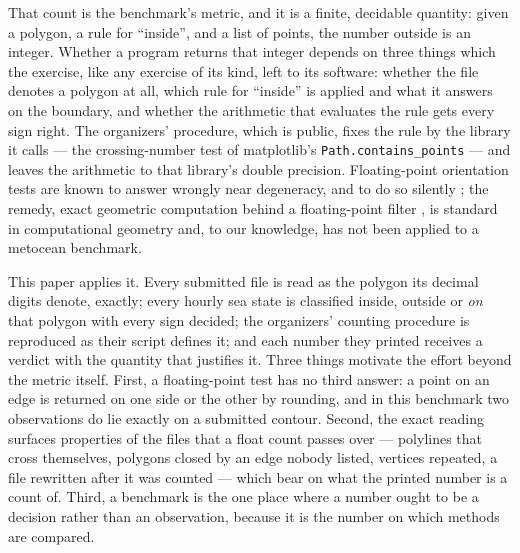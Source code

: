 \documentclass[preprint,11pt,authoryear]{elsarticle}
\begin{document}
That count is the benchmark's metric, and it is a finite, decidable quantity: given a polygon, a rule for ``inside'', and a list of points, the number outside is an integer. Whether a program returns that integer depends on three things which the exercise, like any exercise of its kind, left to its software: whether the file denotes a polygon at all, which rule for ``inside'' is applied and what it answers on the boundary, and whether the arithmetic that evaluates the rule gets every sign right. The organizers' procedure, which is public, fixes the rule by the library it calls --- the crossing-number test of matplotlib's \texttt{Path.contains\_points} \citep{hunter2007} --- and leaves the arithmetic to that library's double precision. Floating-point orientation tests are known to answer wrongly near degeneracy, and to do so silently \citep{kettner2008,shewchuk1997}; the remedy, exact geometric computation behind a floating-point filter \citep{yap1997,fortune1996}, is standard in computational geometry and, to our knowledge, has not been applied to a metocean benchmark.

This paper applies it. Every submitted file is read as the polygon its decimal digits denote, exactly; every hourly sea state is classified inside, outside or \emph{on} that polygon with every sign decided; the organizers' counting procedure is reproduced as their script defines it; and each number they printed receives a verdict with the quantity that justifies it. Three things motivate the effort beyond the metric itself. First, a floating-point test has no third answer: a point on an edge is returned on one side or the other by rounding, and in this benchmark two observations do lie exactly on a submitted contour. Second, the exact reading surfaces properties of the files that a float count passes over --- polylines that cross themselves, polygons closed by an edge nobody listed, vertices repeated, a file rewritten after it was counted --- which bear on what the printed number is a count of. Third, a benchmark is the one place where a number ought to be a decision rather than an observation, because it is the number on which methods are compared.
\end{document}
